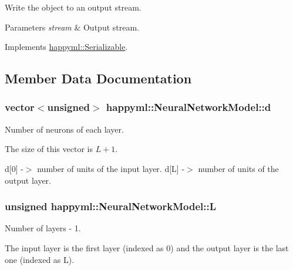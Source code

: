 Write the object to an output stream. 


\begin{DoxyParams}{Parameters}
{\em stream} & Output stream. \\
\hline
\end{DoxyParams}


Implements \hyperlink{classhappyml_1_1Serializable_a2d503e4c2e39c5be8a33bcc8b691949f}{happyml\+::\+Serializable}.



\subsection{Member Data Documentation}
\subsubsection[{\texorpdfstring{d}{d}}]{\setlength{\rightskip}{0pt plus 5cm}vector$<$unsigned$>$ happyml\+::\+Neural\+Network\+Model\+::d\hspace{0.3cm}{\ttfamily [protected]}}\hypertarget{classhappyml_1_1NeuralNetworkModel_a36ee0888f3c3e0f3197bce8fbc57831d}{}\label{classhappyml_1_1NeuralNetworkModel_a36ee0888f3c3e0f3197bce8fbc57831d}


Number of neurons of each layer. 

The size of this vector is $L + 1$.

d\mbox{[}0\mbox{]} -\/$>$ number of units of the input layer. d\mbox{[}L\mbox{]} -\/$>$ number of units of the output layer. 
\subsubsection[{\texorpdfstring{L}{L}}]{\setlength{\rightskip}{0pt plus 5cm}unsigned happyml\+::\+Neural\+Network\+Model\+::L\hspace{0.3cm}{\ttfamily [protected]}}\hypertarget{classhappyml_1_1NeuralNetworkModel_ac7e46ff5974de133f5863ee02b620096}{}\label{classhappyml_1_1NeuralNetworkModel_ac7e46ff5974de133f5863ee02b620096}


Number of layers -\/ 1. 

The input layer is the first layer (indexed as 0) and the output layer is the last one (indexed as L). 
